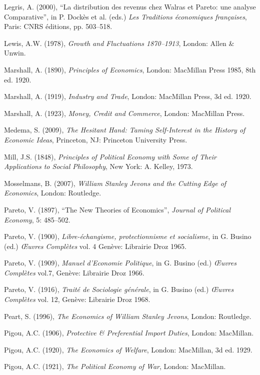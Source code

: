 \documentclass[12pt]{article}
\begin{document}
\begin{description}
    \item Legris, A. (2000), “La distribution des revenus chez Walras et Pareto: une analyse Comparative”, in P. Dockès et al. (eds.) \textit{Les Traditions économiques françaises}, Paris: CNRS éditions, pp. 503–518.
    \item Lewis, A.W. (1978), \textit{Growth and Fluctuations 1870–1913}, London: Allen \& Unwin.
    \item Marshall, A. (1890), \textit{Principles of Economics}, London: MacMillan Press 1985, 8th ed. 1920.
    \item Marshall, A. (1919), \textit{Industry and Trade}, London: MacMillan Press, 3d ed. 1920.
    \item Marshall, A. (1923), \textit{Money, Credit and Commerce}, London: MacMillan Press.
    \item Medema, S. (2009), \textit{The Hesitant Hand: Taming Self-Interest in the History of Economic Ideas}, Princeton, NJ: Princeton University Press.
    \item Mill, J.S. (1848), \textit{Principles of Political Economy with Some of Their Applications to Social Philosophy}, New York: A. Kelley, 1973.
    \item Mosselmans, B. (2007), \textit{William Stanley Jevons and the Cutting Edge of Economics}, London: Routledge.
    \item Pareto, V. (1897), “The New Theories of Economics”, \textit{Journal of Political Economy}, 5: 485–502.
    \item Pareto, V. (1900), \textit{Libre-échangisme, protectionnisme et socialisme}, in G. Busino (ed.) \textit{Œuvres Complètes} vol. 4 Genève: Librairie Droz 1965.
    \item Pareto, V. (1909), \textit{Manuel d’Economie Politique}, in G. Busino (ed.) \textit{Œuvres Complètes} vol.7, Genève: Librairie Droz 1966.
    \item Pareto, V. (1916), \textit{Traité de Sociologie générale}, in G. Busino (ed.) \textit{Œuvres Complètes} vol. 12, Genève: Librairie Droz 1968.
    \item Peart, S. (1996), \textit{The Economics of William Stanley Jevons}, London: Routledge.
    \item Pigou, A.C. (1906), \textit{Protective \& Preferential Import Duties}, London: MacMillan.
    \item Pigou, A.C. (1920), \textit{The Economics of Welfare}, London: MacMillan, 3d ed. 1929.
    \item Pigou, A.C. (1921), \textit{The Political Economy of War}, London: MacMillan.

\end{description}
\end{document}
